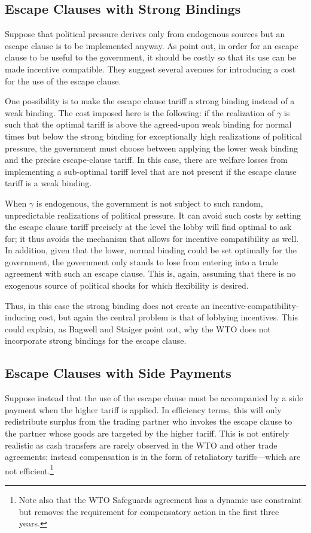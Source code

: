 \documentclass[12pt]{article}
\newcommand{\ga}{\gamma}
\begin{document}
\subsection{Escape Clauses with Strong Bindings}
\label{sec:strong}
Suppose that political pressure derives only from endogenous sources but an escape clause is to be implemented anyway. As \Textcite{bs2005} point out, in order for an escape clause to be useful to the government, it should be costly so that its use can be made incentive compatible. They suggest several avenues for introducing a cost for the use of the escape clause.

One possibility is to make the escape clause tariff a strong binding instead of a weak binding. The cost imposed here is the following: if the realization of $\ga$ is such that the optimal tariff is above the agreed-upon weak binding for normal times but below the strong binding for exceptionally high realizations of political pressure, the government must choose between applying the lower weak binding and the precise escape-clause tariff. In this case, there are welfare losses from implementing a sub-optimal tariff level that are not present if the escape clause tariff is a weak binding.

When $\ga$ is endogenous, the government is not subject to such random, unpredictable realizations of political pressure. It can avoid such costs by setting the escape clause tariff precisely at the level the lobby will find optimal to ask for; it thus avoids the mechanism that allows for incentive compatibility as well. In addition, given that the lower, normal binding could be set optimally for the government, the government only stands to lose from entering into a trade agreement with such an escape clause. This is, again, assuming that there is no exogenous source of political shocks for which flexibility is desired.

Thus, in this case the strong binding does not create an incentive-compatibility-inducing cost, but again the central problem is that of lobbying incentives. This could explain, as Bagwell and Staiger point out, why the WTO does not incorporate strong bindings for the escape clause.

\subsection{Escape Clauses with Side Payments}
Suppose instead that the use of the escape clause must be accompanied by a side payment when the higher tariff is applied. In efficiency terms, this will only redistribute surplus from the trading partner who invokes the escape clause to the partner whose goods are targeted by the higher tariff. This is not entirely realistic as cash transfers are rarely observed in the WTO and other trade agreements; instead compensation is in the form of retaliatory tariffs---which are not efficient.\footnote{Note also that the WTO Safeguards agreement has a dynamic use constraint but removes the requirement for compensatory action in the first three years.}
\end{document}
